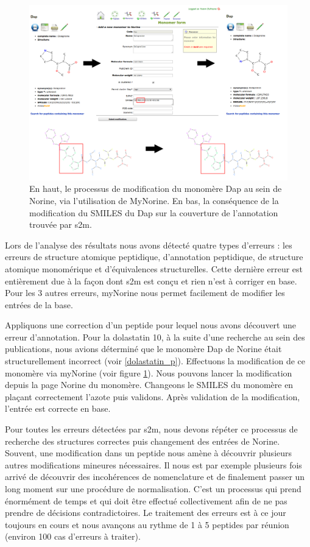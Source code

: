 \begin{figure}[h!]
  \begin{center}
    \includegraphics[width=450px]{Figures/contributions/dap_modif.png}
    \caption{\label{dap_modif}En haut, le processus de modification du monomère Dap au sein de Norine, via l'utilisation de MyNorine.
    En bas, la conséquence de la modification du SMILES du Dap sur la couverture de l'annotation trouvée par s2m.}
  \end{center}
\end{figure}

Lors de l'analyse des résultats nous avons détecté quatre types d'erreurs : les erreurs de structure atomique peptidique, d'annotation peptidique, de structure atomique monomérique et d'équivalences structurelles.
Cette dernière erreur est entièrement due à la façon dont s2m est conçu et rien n'est à corriger en base.
Pour les 3 autres erreurs, myNorine nous permet facilement de modifier les entrées de la base.

Appliquons une correction d'un peptide pour lequel nous avons découvert une erreur d'annotation.
Pour la dolastatin 10, à la suite d'une recherche au sein des publications, nous avions déterminé que le monomère Dap de Norine était structurellement incorrect (voir \ref{dolastatin_p}).
Effectuons la modification de ce monomère via myNorine (voir figure \ref{dap_modif}).
Nous pouvons lancer la modification depuis la page Norine du monomère.
Changeons le SMILES du monomère en plaçant correctement l'azote puis validons.
Après validation de la modification, l'entrée est correcte en base.

Pour toutes les erreurs détectées par s2m, nous devons répéter ce processus de recherche des structures correctes puis changement des entrées de Norine.
Souvent, une modification dans un peptide nous amène à découvrir plusieurs autres modifications mineures nécessaires.
Il nous est par exemple plusieurs fois arrivé de découvrir des incohérences de nomenclature et de finalement passer un long moment sur une procédure de normalisation.
C'est un processus qui prend énormément de temps et qui doit être effectué collectivement afin de ne pas prendre de décisions contradictoires.
Le traitement des erreurs est à ce jour toujours en cours et nous avançons au rythme de 1 à 5 peptides par réunion (environ 100 cas d'erreurs à traiter).



